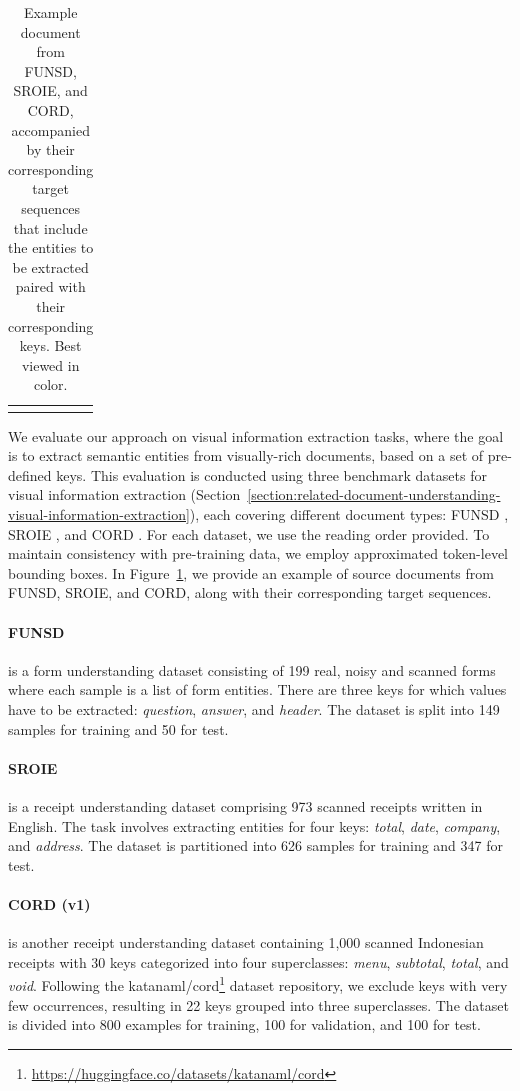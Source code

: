 \begin{table}[H]
\begin{tabular}{  c | c | c  }
\begin{minipage}{.2\textwidth}
    \end{minipage}
    \\
  \end{tabular}
  \caption{Example document from FUNSD, SROIE, and CORD, accompanied by their corresponding target sequences that include the entities to be extracted paired with their corresponding keys. Best viewed in color.}
  \label{fig:source-target-sample}
\end{table}

We evaluate our approach on visual information extraction tasks, where the goal is to extract semantic entities from visually-rich documents, based on a set of pre-defined keys. This evaluation is conducted using three benchmark datasets for visual information extraction (Section~\ref{section:related-document-understanding-visual-information-extraction}), each covering different document types: FUNSD \citep{jaume2019funsd}, SROIE \citep{huang2019icdar2019}, and CORD \citep{park2019cord}. For each dataset, we use the reading order provided. To maintain consistency with pre-training data, we employ approximated token-level bounding boxes. In Figure~\ref{fig:source-target-sample}, we provide an example of source documents from FUNSD, SROIE, and CORD, along with their corresponding target sequences. 

\paragraph{FUNSD} \citep{jaume2019funsd} is a form understanding dataset consisting of 199 real, noisy and scanned forms where each sample is a list of form entities. There are three keys for which values have to be extracted: \textit{question}, \textit{answer}, and \textit{header}. The dataset is split into 149 samples for training and 50 for test.

\paragraph{SROIE} \citep{huang2019icdar2019} is a receipt understanding dataset comprising 973 scanned receipts written in English. The task involves extracting entities for four keys: \textit{total}, \textit{date}, \textit{company}, and \textit{address}. The dataset is partitioned into 626 samples for training and 347 for test. 

\paragraph{CORD (v1)} \citep{park2019cord} is another receipt understanding dataset containing 1,000 scanned Indonesian receipts with 30 keys categorized into four superclasses: \textit{menu}, \textit{subtotal}, \textit{total}, and \textit{void}. Following the katanaml/cord\footnote{\url{https://huggingface.co/datasets/katanaml/cord}} dataset repository, we exclude keys with very few occurrences, resulting in 22 keys grouped into three superclasses. The dataset is divided into 800 examples for training, 100 for validation, and 100 for test. 

